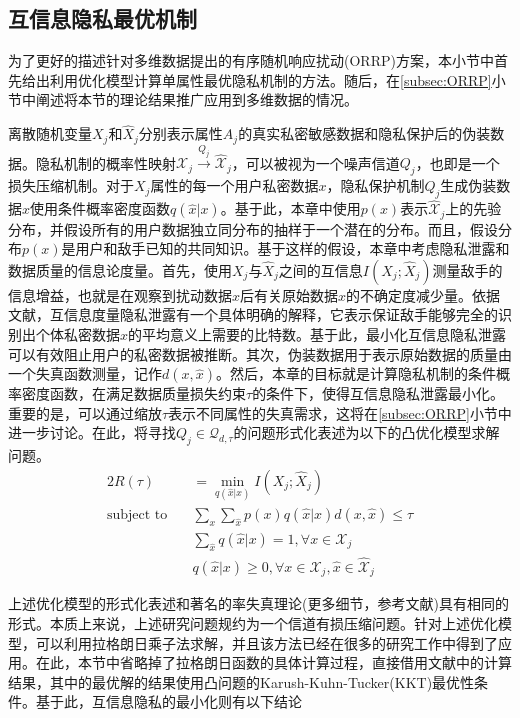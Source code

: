 \subsection{互信息隐私最优机制}\label{subsec:MI_optimal_mechanism}

为了更好的描述针对多维数据提出的有序随机响应扰动(ORRP)方案，本小节中首先给出利用优化模型计算单属性最优隐私机制的方法。随后，在\ref{subsec:ORRP}小节中阐述将本节的理论结果推广应用到多维数据的情况。


离散随机变量$X_j$和$\hat{X}_j$分别表示属性$A_j$的真实私密敏感数据和隐私保护后的伪装数据。隐私机制的概率性映射$\mathcal{X}_j \xrightarrow{Q_j} \hat{\mathcal{X}}_j$，可以被视为一个噪声信道$Q_j$，也即是一个损失压缩机制。对于$X_j$属性的每一个用户私密数据$x$，隐私保护机制$Q_j$生成伪装数据$\hat{x}$使用条件概率密度函数$q(\hat{x}|x)$。基于此，本章中使用$p(x)$表示$\hat{\mathcal{X}}_j$上的先验分布，并假设所有的用户数据独立同分布的抽样于一个潜在的分布。而且，假设分布$p(x)$是用户和敌手已知的共同知识。基于这样的假设，本章中考虑隐私泄露和数据质量的信息论度量。首先，使用$X_j$与$\hat{X}_j$之间的互信息$I(X_j;\hat{X}_j)$测量敌手的信息增益，也就是在观察到扰动数据$\hat{x}$后有关原始数据$x$的不确定度减少量。依据文献，互信息度量隐私泄露有一个具体明确的解释，它表示保证敌手能够完全的识别出个体私密数据$x$的平均意义上需要的比特数。基于此，最小化互信息隐私泄露可以有效阻止用户的私密数据被推断。其次，伪装数据用于表示原始数据的质量由一个失真函数测量，记作$d(x,\hat{x})$。然后，本章的目标就是计算隐私机制的条件概率密度函数，在满足数据质量损失约束$\tau$的条件下，使得互信息隐私泄露最小化。重要的是，可以通过缩放$\tau$表示不同属性的失真需求，这将在\ref{subsec:ORRP}小节中进一步讨论。在此，将寻找$Q_j \in \mathcal{Q}_{d,\tau}$的问题形式化表述为以下的凸优化模型求解问题。
\begin{alignat}{2}
  R(\tau)  & =\min_{q(\hat{x}|x)} I(X_j;\hat{X}_j) \label{min:lp1}  \nonumber\\
   \mbox{subject to} \quad
   & \sum_{x}\sum_{\hat{x}}p(x)q(\hat{x}|x)d(x,\hat{x})\leq\tau \\
   & \sum_{\hat{x}} q(\hat{x}|x)=1,\forall x\in \mathcal{X}_j \\
   & q(\hat{x}|x)\geq 0,\forall x \in \mathcal{X}_j,\hat{x}\in \hat{\mathcal{X}}_j
   \end{alignat}

上述优化模型的形式化表述和著名的率失真理论(更多细节，参考文献)具有相同的形式\cite{wang2016on}。本质上来说，上述研究问题规约为一个信道有损压缩问题。针对上述优化模型，可以利用拉格朗日乘子法求解，并且该方法已经在很多的研究工作中得到了应用。在此，本节中省略掉了拉格朗日函数的具体计算过程，直接借用文献中的计算结果，其中的最优解的结果使用凸问题的Karush-Kuhn-Tucker(KKT)最优性条件\cite{boyd2004convex}。基于此，互信息隐私的最小化则有以下结论

